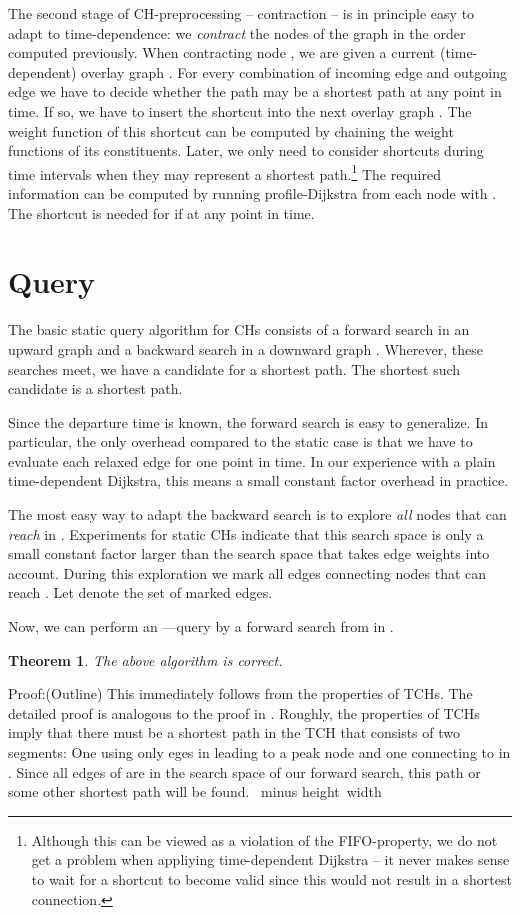 \documentclass[12pt]{article}
\def\endofbeweis{~\quad\hglue\hsize minus\hsize
                 \hbox{\vrule height \endofsize width
\endofsize}\par}
\newenvironment{proof}{Proof:}{\endofbeweis}
\newtheorem{theorem}{Theorem}
\begin{document}
The second stage of CH-preprocessing -- contraction -- is in principle
easy to adapt to time-dependence: we \emph{contract} the nodes of the
graph in the order computed previously. When contracting node , we are given a current (time-dependent) overlay graph
. For every combination of incoming edge  and
outgoing edge  we have to decide whether the path
 may be a shortest path at any point in time.  If so, we
have to insert the shortcut  into the next overlay graph
. The weight function of this shortcut can be computed
by chaining the weight functions of its constituents.
Later, we only need to consider shortcuts during time intervals when they
may represent a shortest path.\footnote{Although this can be viewed as a violation of
the FIFO-property, we do not get a problem when appliying time-dependent Dijkstra --
it never makes sense to wait for a shortcut to become valid since
this would not result in a shortest connection.}
The
required information can be computed by running profile-Dijkstra from
each node  with . The shortcut is needed for  if
 at any point in time.


\section{Query}\label{s:query}

The basic static query algorithm for CHs consists of a forward search in
an upward graph  and a backward search in a downward graph .
Wherever, these searches meet, we have a candidate for a shortest path.
The shortest such candidate is a shortest path.

Since the departure time is known, the forward search is easy to
generalize. In particular, the only overhead compared to the static case
is that we have to evaluate each relaxed edge for one point in time.
In our experience with a plain time-dependent Dijkstra, this means
a small constant factor overhead in practice.

The most easy way to adapt the backward search is to explore
\emph{all} nodes that can \emph{reach}  in .
Experiments for static CHs \cite{Gei08} indicate that
this search space is only a small constant factor larger than
the search space that takes edge weights into account.
During this exploration we mark all edges connecting nodes that
can reach . Let  denote the set of marked edges.

Now, we can perform an ---query by a forward search from  in
. 

\begin{theorem}
The above algorithm is correct.
\end{theorem}
\begin{proof}(Outline)
This immediately follows from the properties of TCHs.
The detailed proof is analogous to the proof in \cite{Gei08}. 
Roughly, the properties of TCHs imply that there
must be a shortest path  in the TCH that consists of two segments:
One using only eges in  leading to a peak node  and
one connecting  to  in . Since all edges of  are
in the search space of our forward search, this path or some other
shortest path will be found.  
\end{proof}
\end{document}
